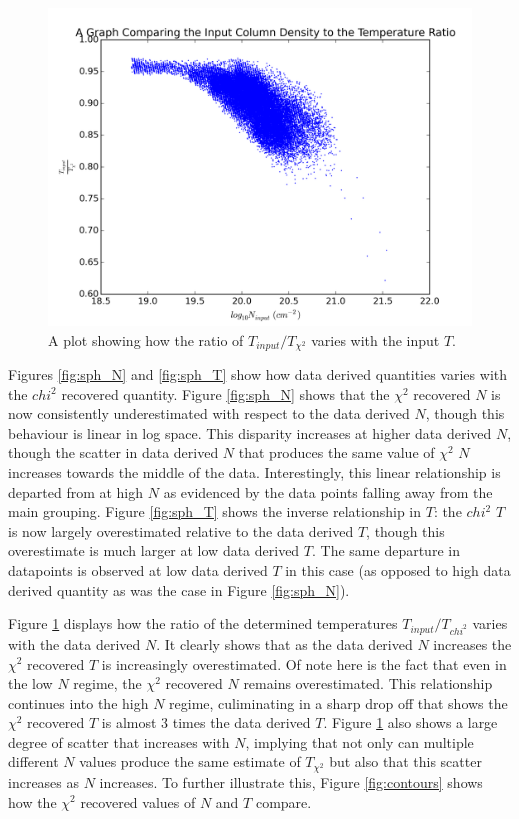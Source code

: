 \documentclass{report}
\begin{document}
\begin{figure}[H]
  \centering
  \includegraphics[width=0.4\linewidth]{../img/sph/T_ratio_inp.png}
  \caption{A plot showing how the ratio of $T_{input}/T_{\chi^{2}}$ varies with the input $T$.}\label{fig:T_ratio_sph}
\end{figure}

Figures \ref{fig:sph_N} and \ref{fig:sph_T} show how data derived quantities varies with the $chi^{2}$ recovered quantity. Figure \ref{fig:sph_N} shows that the $\chi^{2}$ recovered $N$ is now consistently underestimated with respect to the data derived $N$, though this behaviour is linear in log space. This disparity increases at higher data derived $N$, though the scatter in data derived $N$ that produces the same value of $\chi^{2}$ $N$ increases towards the middle of the data. Interestingly, this linear relationship is departed from at high $N$ as evidenced by the data points falling away from the main grouping. Figure \ref{fig:sph_T} shows the inverse relationship in
$T$: the $chi^{2}$ $T$ is now largely overestimated relative to the data derived $T$, though this overestimate is much larger at low data derived $T$. The same departure in datapoints is observed at low data derived $T$ in this case (as opposed to high data derived quantity as was the case in Figure \ref{fig:sph_N}).

Figure \ref{fig:T_ratio_sph} displays how the ratio of the determined temperatures $T_{input}/T_{chi^{2}}$ varies with the data derived $N$. It clearly shows that as the data derived $N$ increases the $\chi^{2}$ recovered $T$ is increasingly overestimated. Of note here is the fact that even in the low $N$ regime, the $\chi^{2}$ recovered $N$ remains overestimated. This relationship continues into the high $N$ regime, culiminating in a sharp drop off that shows the $\chi^{2}$ recovered $T$ is almost 3 times the data derived $T$.
Figure \ref{fig:T_ratio_sph} also shows a large degree of scatter that increases with $N$, implying that not only can multiple different $N$ values produce the same estimate of $T_{\chi^{2}}$ but also that this scatter increases as $N$ increases. To further illustrate this, Figure \ref{fig:contours} shows how the $\chi^{2}$ recovered values of $N$ and $T$ compare.
\end{document}
